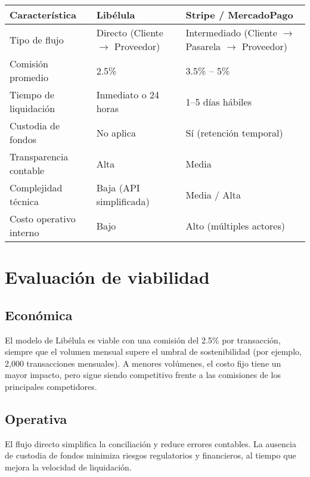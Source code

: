     \begin{center}
        \begin{tabular}{>{\raggedright}p{4cm} p{5cm} p{5cm}}
            \toprule
            \textbf{Característica} & \textbf{Libélula} & \textbf{Stripe / MercadoPago} \\
            \midrule
            Tipo de flujo & Directo (Cliente $\rightarrow$ Proveedor) & Intermediado (Cliente $\rightarrow$ Pasarela $\rightarrow$ Proveedor) \\
            Comisión promedio & 2.5\% & 3.5\% -- 5\% \\
            Tiempo de liquidación & Inmediato o 24 horas & 1--5 días hábiles \\
            Custodia de fondos & No aplica & Sí (retención temporal) \\
            Transparencia contable & Alta & Media \\
            Complejidad técnica & Baja (API simplificada) & Media / Alta \\
            Costo operativo interno & Bajo & Alto (múltiples actores) \\
            \bottomrule
        \end{tabular}
    \end{center}
    
\section{Evaluación de viabilidad}

    \subsection{Económica}
		El modelo de Libélula es viable con una comisión del 2.5\% por transacción, siempre que el volumen mensual supere el 
		umbral de sostenibilidad (por ejemplo, 2,000 transacciones mensuales). A menores volúmenes, el costo fijo tiene un mayor 
		impacto, pero sigue siendo competitivo frente a las comisiones de los principales competidores.\par
    
    \subsection{Operativa}
    	El flujo directo simplifica la conciliación y reduce errores contables. La ausencia de custodia de fondos minimiza 
		riesgos regulatorios y financieros, al tiempo que mejora la velocidad de liquidación.\par
    
